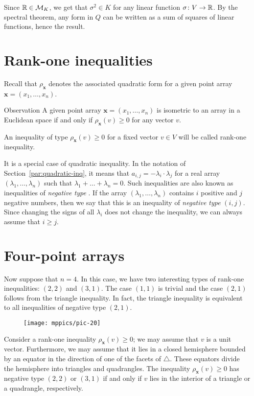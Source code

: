 \documentclass[a4paper,10pt]{article}
\begin{document}
Since $\mathbb{R}\in \mathcal{M}_K$, we get that $\sigma^2\in K$ for any linear function $\sigma\colon V\to\mathbb{R}$.
By the spectral theorem, any form in $Q$ can be written as a sum of squares of linear functions, hence the result.
\qeds

\section{Rank-one inequalities}\label{par:rank-one}
Recall that $\rho_{\bm{x}}$ denotes the associated quadratic form for a given point array $\bm{x}=(x_1,\dots,x_n)$.

\begin{thm}{Observation}\label{obs:rank-one}
A given point array $\bm{x}=(x_1,\dots,x_n)$ is isometric to an array in a Euclidean space if and only if $\rho_{\bm{x}}(v)\ge 0$ for any vector $v$.
\end{thm}

An inequality of type $\rho_{\bm{x}}(v)\ge 0$ for a fixed vector $v\in V$ will be called rank-one inequality.

It is a special case of quadratic inequality.
In the notation of Section~\ref{par:quadratic-inq}, it means that $a_{i,j}=-\lambda_i\cdot\lambda_j$ for a real array $(\lambda_1,\dots, \lambda_n)$ such that
$\lambda_1+\dots+\lambda_n=0$.
Such inequalities are also known as inequalities of \emph{negative type} \cite{deza-lauren}.
If the array $(\lambda_1,\dots, \lambda_n)$ contains $i$ positive and $j$ negative numbers,
then we say that this is an inequality of \emph{negative type} $(i,j)$.
Since changing the signs of all $\lambda_i$ does not change the inequality, we can always assume that $i\ge j$.

\section{Four-point arrays}\label{Four-point arrays}
Now suppose that $n=4$.
In this case, we have two interesting types of rank-one inequalities: $(2,2)$ and $(3,1)$.
The case $(1,1)$ is trivial and 
the case $(2,1)$ follows from the triangle inequality.
In fact, the triangle inequality is equivalent to all inequalities of negative type $(2,1)$.

\begin{wrapfigure}{o}{36mm}
\centering
\vskip-4mm
\texttt{[image: mppics/pic-20]}
\vskip-0mm
\end{wrapfigure}

Consider a rank-one inequality $\rho_{\bm{x}}(v)\ge 0$; we may assume that $v$ is a unit vector.
Furthermore, we may assume that it lies in a closed hemisphere bounded by an equator in the direction of one of the facets of $\triangle$.
These equators divide the hemisphere into triangles and quadrangles.
The inequality $\rho_{\bm{x}}(v)\ge 0$ has negative type $(2,2)$ or $(3,1)$
if and only if $v$ lies in the interior of a triangle or a quadrangle, respectively.
\end{document}
